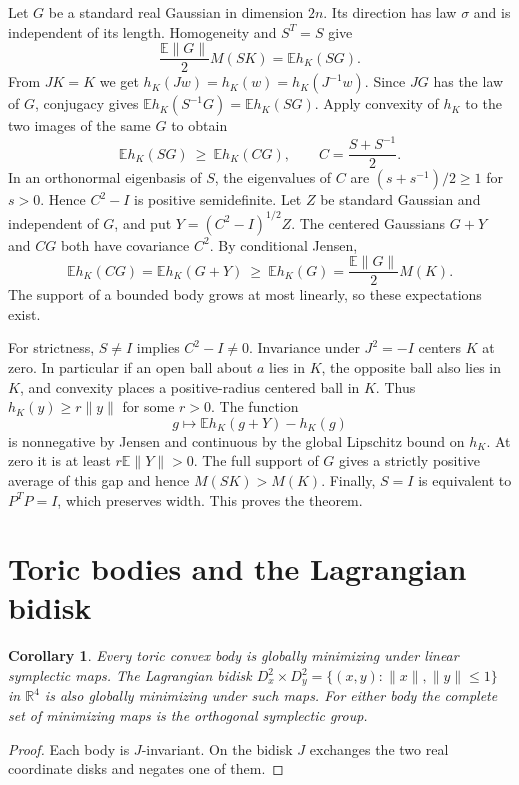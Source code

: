 \documentclass[11pt,a4paper]{amsart}
\newtheorem{corollary}[theorem]{Corollary}
\newcommand{\E}{\mathbb E}
\begin{document}
Let \(G\) be a standard real Gaussian in dimension \(2n\). Its direction has law \(\sigma\) and is independent of its length. Homogeneity and \(S^T=S\) give
\[
  \frac{\E\|G\|}{2}M(SK)=\E h_K(SG).
\]
From \(JK=K\) we get \(h_K(Jw)=h_K(w)=h_K(J^{-1}w)\). Since \(JG\) has the law of \(G\), conjugacy gives \(\E h_K(S^{-1}G)=\E h_K(SG)\). Apply convexity of \(h_K\) to the two images of the same \(G\) to obtain
\[
  \E h_K(SG)\ \geq\ \E h_K(CG),\qquad C=\frac{S+S^{-1}}{2}.
\]
In an orthonormal eigenbasis of \(S\), the eigenvalues of \(C\) are \((s+s^{-1})/2\geq 1\) for \(s>0\). Hence \(C^2-I\) is positive semidefinite. Let \(Z\) be standard Gaussian and independent of \(G\), and put \(Y=(C^2-I)^{1/2}Z\). The centered Gaussians \(G+Y\) and \(CG\) both have covariance \(C^2\). By conditional Jensen,
\[
  \E h_K(CG)=\E h_K(G+Y)\ \geq\ \E h_K(G)
  =\frac{\E\|G\|}{2}M(K).
\]
The support of a bounded body grows at most linearly, so these expectations exist.

For strictness, \(S\ne I\) implies \(C^2-I\ne 0\). Invariance under \(J^2=-I\) centers \(K\) at zero. In particular if an open ball about \(a\) lies in \(K\), the opposite ball also lies in \(K\), and convexity places a positive-radius centered ball in \(K\). Thus \(h_K(y)\geq r\|y\|\) for some \(r>0\). The function
\[
    g\longmapsto \E h_K(g+Y)-h_K(g)
\]
is nonnegative by Jensen and continuous by the global Lipschitz bound on \(h_K\). At zero it is at least \(r\E\|Y\|>0\). The full support of \(G\) gives a strictly positive average of this gap and hence \(M(SK)>M(K)\). Finally, \(S=I\) is equivalent to \(P^TP=I\), which preserves width. This proves the theorem.

\section{Toric bodies and the Lagrangian bidisk}
\begin{corollary}
Every toric convex body is globally minimizing under linear symplectic maps. The Lagrangian bidisk \(D_x^2\times D_y^2=\{(x,y):\|x\|,\|y\|\leq 1\}\) in \(\mathbb R^4\) is also globally minimizing under such maps. For either body the complete set of minimizing maps is the orthogonal symplectic group.
\end{corollary}
\begin{proof}
Each body is \(J\)-invariant. On the bidisk \(J\) exchanges the two real coordinate disks and negates one of them.
\end{proof}
\end{document}

